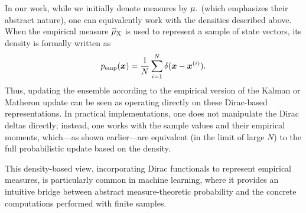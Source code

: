 \documentclass[wcp]{jmlr} %
\begin{document}
In our work, while we initially denote measures by \(\Law[\cdot]\) (which emphasizes their abstract nature), one can equivalently work with the densities described above. When the empirical measure \(\ELaw[\mm{X}]\) is used to represent a sample of state vectors, its density is formally written as
\begin{equation}
    p_{\text{emp}}(\boldsymbol{x}) = \frac{1}{N} \sum_{i=1}^N \delta(\boldsymbol{x}-\boldsymbol{x}^{(i)}).
\end{equation}
Thus, updating the ensemble according to the empirical version of the Kalman or Matheron update can be seen as operating directly on these Dirac-based representations. In practical implementations, one does not manipulate the Dirac deltas directly; instead, one works with the sample values and their empirical moments, which—as shown earlier—are equivalent (in the limit of large \(N\)) to the full probabilistic update based on the density.

This density-based view, incorporating Dirac functionals to represent empirical measures, is particularly common in machine learning, where it provides an intuitive bridge between abstract measure-theoretic probability and the concrete computations performed with finite samples.
\end{document}
